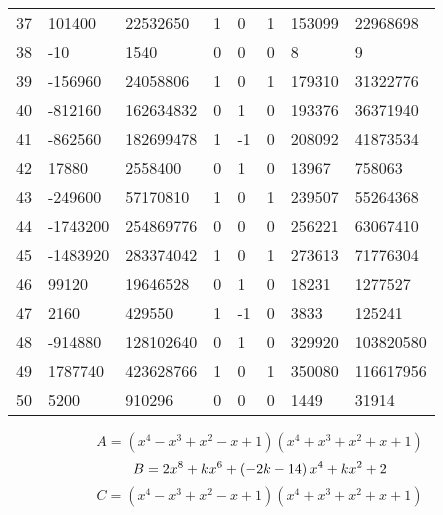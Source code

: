 \documentclass{amsart}
\begin{document}
\begin{longtable}{|l|l|l|lllll|}
37&101400&22532650&1&0&1&153099&22968698\\
38&-10&1540&0&0&0&8&9\\
39&-156960&24058806&1&0&1&179310&31322776\\
40&-812160&162634832&0&1&0&193376&36371940\\
41&-862560&182699478&1&-1&0&208092&41873534\\
42&17880&2558400&0&1&0&13967&758063\\
43&-249600&57170810&1&0&1&239507&55264368\\
44&-1743200&254869776&0&0&0&256221&63067410\\
45&-1483920&283374042&1&0&1&273613&71776304\\
46&99120&19646528&0&1&0&18231&1277527\\
47&2160&429550&1&-1&0&3833&125241\\
48&-914880&128102640&0&1&0&329920&103820580\\
49&1787740&423628766&1&0&1&350080&116617956\\
50&5200&910296&0&0&0&1449&31914\\
\hline
\end{longtable}
$$A=(x^4
 - x^3
 + x^2
 - x
 + 1)(x^4
 + x^3
 + x^2
 + x
 + 1)$$
$$B=2\*x^8
 + k\*x^6
 + \left(-2\*k
 - 14\right) \*x^4
 + k\*x^2
 + 2$$
$$C=(x^4
 - x^3
 + x^2
 - x
 + 1)(x^4
 + x^3
 + x^2
 + x
 + 1)$$
\end{document}
